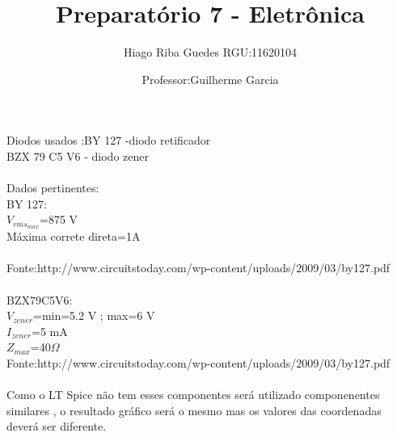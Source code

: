 \documentclass[11pt,a4paper]{article}
\title{Preparatório 7 - Eletrônica}
\author{Hiago Riba Guedes RGU:11620104}
\date{Professor:Guilherme Garcia}
\begin{document}
\maketitle

Diodos usados :BY 127 -diodo retificador\\
BZX 79 C5 V6 - diodo zener\\\\
Dados pertinentes:\\
BY 127:\\
$V_{rms_{max}}$=875 V\\
Máxima correte direta=1A\\\\
Fonte:http://www.circuitstoday.com/wp-content/uploads/2009/03/by127.pdf\\
\\
BZX79C5V6:\\
$V_{zener}$=min=5.2 V ; max=6 V\\
$I_{zener}$=5 mA\\
$Z_{max}$=40$\Omega$\\

Fonte:http://www.circuitstoday.com/wp-content/uploads/2009/03/by127.pdf\\
\\Como o LT Spice não tem esses componentes será utilizado componenentes similares , o resultado gráfico será o mesmo mas os valores das coordenadas deverá ser diferente.\\
\end{document}
